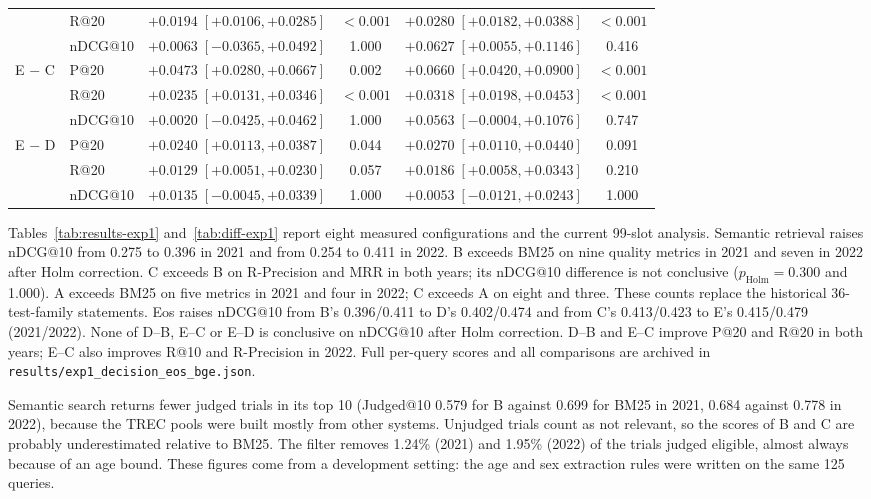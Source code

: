 \documentclass{article}
\begin{document}
\begin{table}[t]
\begin{tabular}{llcccc}
     & R@20 & $+0.0194\;[+0.0106, +0.0285]$ & $<0.001$ & $+0.0280\;[+0.0182, +0.0388]$ & $<0.001$ \\
     & nDCG@10 & $+0.0063\;[-0.0365, +0.0492]$ & 1.000 & $+0.0627\;[+0.0055, +0.1146]$ & 0.416 \\
    \midrule
    E $-$ C & P@20 & $+0.0473\;[+0.0280, +0.0667]$ & 0.002 & $+0.0660\;[+0.0420, +0.0900]$ & $<0.001$ \\
     & R@20 & $+0.0235\;[+0.0131, +0.0346]$ & $<0.001$ & $+0.0318\;[+0.0198, +0.0453]$ & $<0.001$ \\
     & nDCG@10 & $+0.0020\;[-0.0425, +0.0462]$ & 1.000 & $+0.0563\;[-0.0004, +0.1076]$ & 0.747 \\
    \midrule
    E $-$ D & P@20 & $+0.0240\;[+0.0113, +0.0387]$ & 0.044 & $+0.0270\;[+0.0110, +0.0440]$ & 0.091 \\
     & R@20 & $+0.0129\;[+0.0051, +0.0230]$ & 0.057 & $+0.0186\;[+0.0058, +0.0343]$ & 0.210 \\
     & nDCG@10 & $+0.0135\;[-0.0045, +0.0339]$ & 1.000 & $+0.0053\;[-0.0121, +0.0243]$ & 1.000 \\
    \bottomrule
  \end{tabular}
\end{table}

Tables~\ref{tab:results-exp1} and~\ref{tab:diff-exp1} report eight measured configurations and the current 99-slot analysis. Semantic retrieval raises nDCG@10 from 0.275 to 0.396 in 2021 and from 0.254 to 0.411 in 2022. B exceeds BM25 on nine quality metrics in 2021 and seven in 2022 after Holm correction. C exceeds B on R-Precision and MRR in both years; its nDCG@10 difference is not conclusive ($p_{\mathrm{Holm}}=0.300$ and 1.000). A exceeds BM25 on five metrics in 2021 and four in 2022; C exceeds A on eight and three. These counts replace the historical 36-test-family statements. Eos raises nDCG@10 from B's 0.396/0.411 to D's 0.402/0.474 and from C's 0.413/0.423 to E's 0.415/0.479 (2021/2022). None of D--B, E--C or E--D is conclusive on nDCG@10 after Holm correction. D--B and E--C improve P@20 and R@20 in both years; E--C also improves R@10 and R-Precision in 2022. Full per-query scores and all comparisons are archived in \texttt{results/exp1\_decision\_eos\_bge.json}.

Semantic search returns fewer judged trials in its top 10 (Judged@10 0.579 for B against 0.699 for BM25 in 2021, 0.684 against 0.778 in 2022), because the TREC pools were built mostly from other systems. Unjudged trials count as not relevant, so the scores of B and C are probably underestimated relative to BM25. The filter removes 1.24\% (2021) and 1.95\% (2022) of the trials judged eligible, almost always because of an age bound. These figures come from a development setting: the age and sex extraction rules were written on the same 125 queries.
\end{document}

